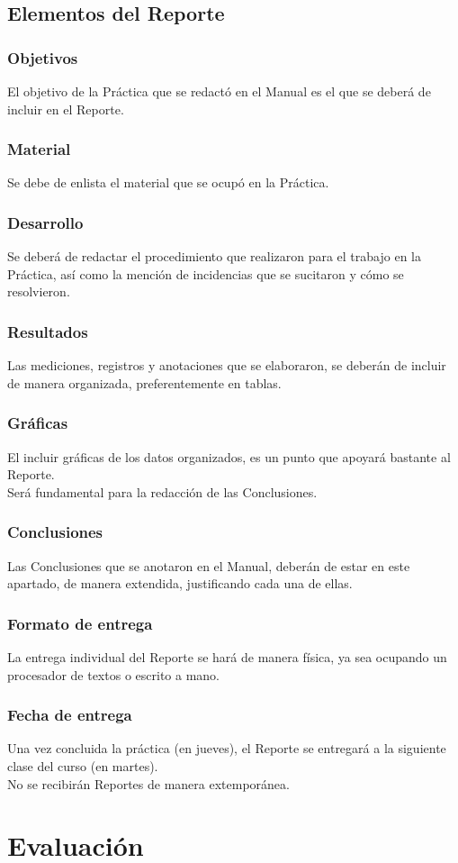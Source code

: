 \documentclass[14pt]{beamer}
\begin{document}
\subsection{Elementos del Reporte}

\begin{frame}
\frametitle{Objetivos}
El objetivo de la Práctica que se redactó en el Manual es el que se deberá de incluir en el Reporte.
\end{frame}
\begin{frame}
\frametitle{Material}
Se debe de enlista el material que se ocupó en la Práctica.
\end{frame}
\begin{frame}
\frametitle{Desarrollo}
Se deberá de redactar el procedimiento que realizaron para el trabajo en la Práctica, \pause así como la mención de incidencias que se sucitaron y cómo se resolvieron. 
\end{frame}
\begin{frame}
\frametitle{Resultados}
Las mediciones, registros y anotaciones que se elaboraron, se deberán de incluir de manera organizada, preferentemente en tablas.
\end{frame}
\begin{frame}
\frametitle{Gráficas}
El incluir gráficas de los datos organizados, es un punto que apoyará bastante al Reporte.
\\
\bigskip
\pause
Será fundamental para la redacción de las Conclusiones.
\end{frame}
\begin{frame}
\frametitle{Conclusiones}
Las Conclusiones que se anotaron en el Manual, \pause deberán de estar en este apartado, de manera extendida, justificando cada una de ellas.
\end{frame}
\begin{frame}
\frametitle{Formato de entrega}
La entrega individual del Reporte se hará de manera física, \pause ya sea ocupando un procesador de textos o escrito a mano.
\end{frame}
\begin{frame}
\frametitle{Fecha de entrega}
Una vez concluida la práctica (en jueves), el Reporte se entregará a la siguiente clase del curso (en martes).
\\
\bigskip
\pause
No se recibirán Reportes de manera extemporánea.
\end{frame}

\section{Evaluación}
\end{document}
